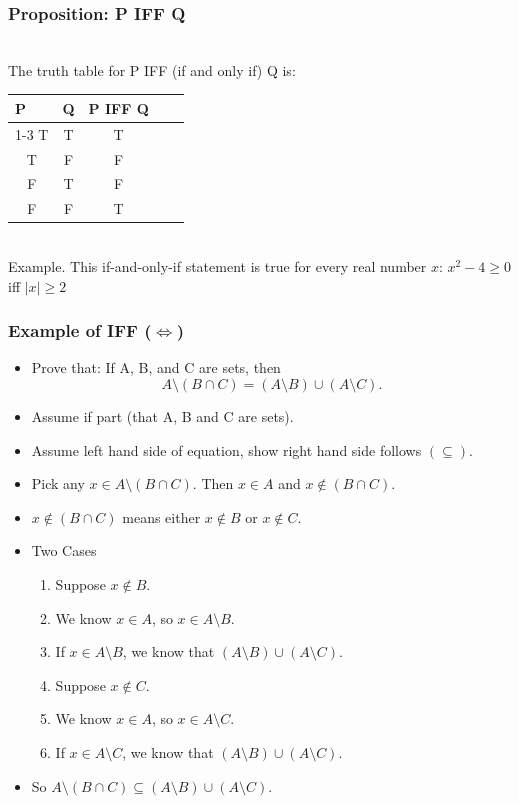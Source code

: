 \documentclass[aspectratio=169]{beamer}
\numberwithin{equation}{section}
\begin{document}
\begin{frame}
\frametitle{Proposition: P IFF Q}

\ \\The truth table for P IFF (if and only if) Q is:

\begin{table}[]
\begin{tabular}{cccll}
\multicolumn{1}{l}{P} & \multicolumn{1}{l}{Q} & \multicolumn{1}{l}{P IFF Q} &  &  \\ \cline{1-3}
T                     & T                     & T                               &  &  \\
T                     & F                     & F                               &  &  \\
F                     & T                     & F                               &  &  \\
F                     & F                     & T                               &  & 
\end{tabular}
\end{table} \pause

\ \\Example. This if-and-only-if statement is true for every real number $x$: $x^{2} - 4 \geq 0$ iff $|x| \geq 2$

\end{frame}



\begin{frame}
\frametitle{Example of IFF ($\iff$)}
\begin{itemize}
\item Prove that: If A, B, and C are sets, then 
$$A \setminus (B \cap C)=(A \setminus B) \cup (A \setminus C).$$\pause
\item[A)] Assume if part (that A, B and C are sets).\pause
\item[B)] Assume left hand side of equation, show right hand side follows $(\subseteq)$.\pause
\item[] Pick any $x\in A \setminus (B \cap C)$.  Then $x\in A$ and $x \notin (B\cap C)$.\pause
\item[] $x \notin (B\cap C)$ means either $x\notin B$ or $x\notin C$.\pause
\item[B.1)] Two Cases\pause
\begin{enumerate}
\item Suppose $x\notin B$. \pause
\item[] We know $x\in A$, so $x\in A \setminus B$. \pause
\item[] If  $x\in A \setminus B$, we know that  $(A \setminus B) \cup (A  \setminus C).$\pause
\item Suppose $x\notin C$. \pause
\item[] We know $x\in A$, so $x\in A \setminus C$. \pause
\item[] If  $x\in A \setminus C$, we know that  $(A \setminus B) \cup (A \setminus C).$\pause
\end{enumerate}
\item[B.2)] So $A \setminus (B \cap C)\subseteq(A \setminus B) \cup (A \setminus C).$
\end{itemize}

\end{frame}
\end{document}
